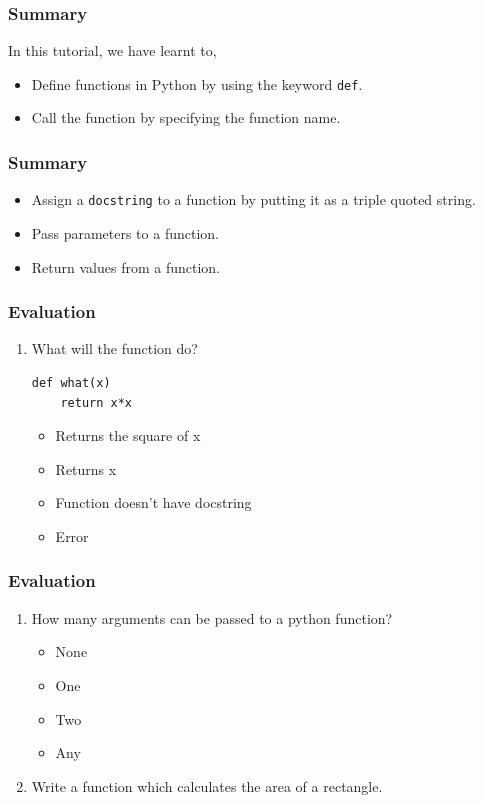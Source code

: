 \documentclass[17pt]{beamer}
\newcounter{saveenumi}
\newcommand{\seti}{\setcounter{saveenumi}{\value{enumi}}}
\newcommand{\conti}{\setcounter{enumi}{\value{saveenumi}}}
\begin{document}
\begin{frame}
\frametitle{Summary}
\label{sec-16.1}

 In this tutorial, we have learnt to,

\begin{itemize}
\item Define functions in Python by using the keyword \texttt{def}.\pause
\item Call the function by specifying the function name.
\end{itemize}
\end{frame}
\begin{frame}
\frametitle{Summary}
\label{sec-16.2}

\begin{itemize}
\item Assign a \texttt{docstring} to a function by putting it as a triple quoted string.\pause
\item Pass parameters to a function.\pause
\item Return values from a function.
\end{itemize}
\end{frame}
\begin{frame}[fragile]
\frametitle{Evaluation}
\label{sec-17.1}

\begin{enumerate}
\item What will the function do?
\lstset{language=Python}
\begin{lstlisting}
def what(x)
    return x*x
\end{lstlisting}\pause
\begin{itemize}
\item Returns the square of x
\item Returns x
\item Function doesn't have docstring
\item Error
\end{itemize}
\seti
\end{enumerate}
\end{frame}
\begin{frame}[fragile]
\frametitle{Evaluation}
\label{sec-17.2}

\begin{enumerate}
\conti
\item How many arguments can be passed to a python function?
\begin{itemize}\pause
\item None
\item One
\item Two
\item Any
\end{itemize}\pause
\item Write a function which calculates the area of a rectangle.
\end{enumerate}
\end{frame}
\end{document}
